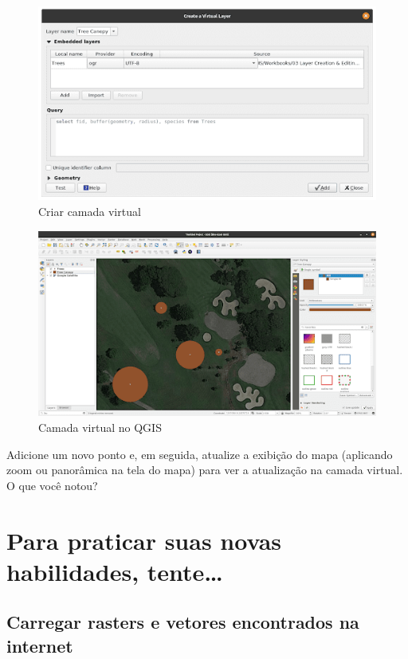 \documentclass[
]{krantz}
\begin{document}
\begin{figure}
\centering
\includegraphics{media/modulo2/virtual-5.png}
\caption{Criar camada virtual}
\end{figure}

\begin{figure}
\centering
\includegraphics{media/modulo2/virtual-6.png}
\caption{Camada virtual no QGIS}
\end{figure}

Adicione um novo ponto e, em seguida, atualize a exibição do mapa (aplicando zoom ou panorâmica na tela do mapa) para ver a atualização na camada virtual. O que você notou?

\hypertarget{para-praticar-suas-novas-habilidades-tente-1}{%
\section{Para praticar suas novas habilidades, tente\ldots{}}\label{para-praticar-suas-novas-habilidades-tente-1}}

\hypertarget{carregar-rasters-e-vetores-encontrados-na-internet}{%
\subsection{Carregar rasters e vetores encontrados na internet}\label{carregar-rasters-e-vetores-encontrados-na-internet}}
\end{document}
